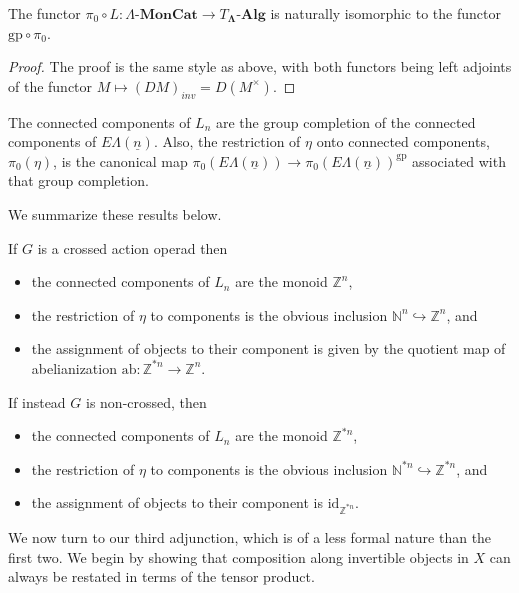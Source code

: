 \documentclass{amsbook} %
\newcommand{\mb}{\mathbf}
\newcommand{\ML}{\mathbf{\Lambda}}
\newcommand{\ELn}{E\Lambda(\underline{n})}
\newcommand{\lmc}{\Lambda\mbox{-}\mb{MonCat}}
\numberwithin{section}{chapter}
\begin{document}
\begin{prop}\label{pilel_gppiel}
The functor $\pi_0 \circ L: \lmc \to T_{\ML}\mbox{-}\mb{Alg}$ is naturally isomorphic to the functor $\textrm{gp} \circ \pi_0$.
\end{prop}
\begin{proof}
The proof is the same style as above, with both functors being  left adjoints of the functor $M \mapsto (DM)_{inv} = D(M^{\times})$.
\end{proof}
\begin{cor}\label{Zconcomp} The connected components of $L_n$ are the group completion of the connected components of $\ELn$. Also, the restriction of $\eta$ onto connected components, $\pi_0(\eta)$, is the canonical map $\pi_0(\ELn) \to \pi_0(\ELn)^{\mathrm{gp}}$ associated with that group completion.
\end{cor}


We summarize these results below.
\begin{cor}\label{crossconcomp} If $G$ is a crossed action operad then
\begin{itemize} 
\item the connected components of $L_n$ are the monoid $\mathbb{Z}^n$,
\item the restriction of $\eta$ to components is the obvious inclusion $\mathbb{N}^n \hookrightarrow \mathbb{Z}^n$, and
\item the assignment of objects to their component is given by the quotient map of abelianization $\mathrm{ab}: \mathbb{Z}^{\ast n} \to \mathbb{Z}^n$.
\end{itemize}
If instead $G$ is non-crossed, then
\begin{itemize} \itemsep0em
\item the connected components of $L_n$ are the monoid $\mathbb{Z}^{\ast n}$,
\item the restriction of $\eta$ to components is the obvious inclusion $\mathbb{N}^{\ast n} \hookrightarrow \mathbb{Z}^{\ast n}$, and
\item the assignment of objects to their component is $\mathrm{id}_{\mathbb{Z}^{\ast n}}$.
\end{itemize}
\end{cor}

We now turn to our third adjunction, which is of a less formal nature than the first two. We begin by showing that composition along invertible objects in $X$ can always be restated in terms of the tensor product.
\end{document}
